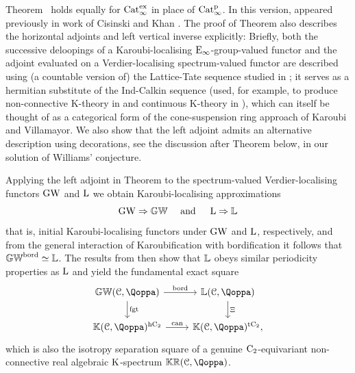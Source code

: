 Theorem~ holds equally for $\mathrm{Cat}_\infty^{\mathrm{ex}}$ in place of $\mathrm{Cat}^{\mathrm p}_\infty$. In this version,  appeared previously in work of Cisinski and Khan \cite{CK}. The proof of Theorem  also describes the horizontal adjoints and left vertical inverse explicitly: Briefly, both the successive deloopings of a Karoubi-localising ${\mathrm{E}_{\infty}}$-group-valued functor and the adjoint evaluated on a Verdier-localising spectrum-valued functor are described using (a countable version of) the Lattice-Tate sequence studied in \papertwo; it serves as a hermitian substitute of the Ind-Calkin sequence (used, for example, to produce non-connective K-theory in \cite{BGT} and continuous K-theory in \cite{Efimov}), which can itself be thought of as a categorical form of the cone-suspension ring approach of Karoubi and Villamayor. %
We also show that the left adjoint admits an alternative description using decorations, see the discussion after Theorem  below, in our solution of Williams' conjecture.

Applying the left adjoint in Theorem \; to the spectrum-valued Verdier-localising functors $\operatorname{GW}$ and $\operatorname L$ we obtain Karoubi-localising approximations 
\[
\operatorname{GW} \Rightarrow \mathbb{GW} \quad \text{ and } \quad \operatorname L \Rightarrow \mathbb{L}
\]
that is, initial Karoubi-localising functors under $\operatorname{GW}$ and $\operatorname L$, respectively, and from the general interaction of Karoubification with bordification it follows that $\mathbb{GW}^{\mathrm{bord}} \simeq \mathbb{L}$. The results from \papertwo then show that $\mathbb{L}$ obeys similar periodicity properties as $\operatorname L$ and yield the fundamental exact square
\[
\begin{tikzcd}
\KGW(\C,\QF) \ar[r,"\bord"] \ar[d,"\fgt"] & \KL(\C,\QF) \ar[d,"\Xi"] \\
\KK(\C,\QF)^\hC \ar[r,"\mathrm{can}"] & \KK(\C,\QF)^\tC,
\end{tikzcd}
\]
which is also the isotropy separation square of a genuine $\mathrm{C_2}$-equivariant non-connective real algebraic $\operatorname K$-spectrum $\KKR(\C,\QF)$.

